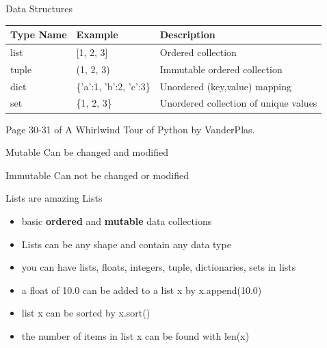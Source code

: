 \documentclass[10pt]{beamer}
\begin{document}

\begin{frame}{Data Structures}
\begin{table}
\begin{tabular}{lll}
\textbf{Type Name} & \textbf{Example} & \textbf{Description} \\
\hline
list  & [1, 2, 3] & Ordered collection \\
tuple & (1, 2, 3) & Immutable ordered collection \\
dict  & \{'a':1, 'b':2, 'c':3\} & Unordered (key,value) mapping \\
set   & \{1, 2, 3\} & Unordered collection of unique values \\
\end{tabular}
\end{table}
Page 30-31 of A Whirlwind Tour of Python by VanderPlas.
	\begin{alertblock}{Mutable}
	Can be changed and modified
	\end{alertblock}
	\begin{alertblock}{Immutable}
	Can not be changed or modified
	\end{alertblock}
\end{frame}

\begin{frame}[fragile]{Lists are amazing}
Lists
\begin{itemize}
\item basic \textbf{ordered} and \textbf{mutable} data collections
\item Lists can be any shape and contain any data type
\item you can have lists, floats, integers, tuple, dictionaries, sets in lists
\item a float of 10.0 can be added to a list x by x.append(10.0)
\item list x can be sorted by x.sort()
\item the number of items in list x can be found with len(x)
\end{itemize}
\end{frame}
\end{document}
